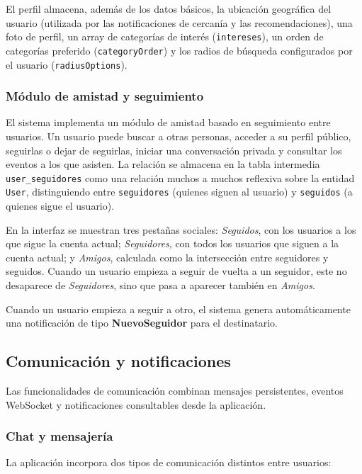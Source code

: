 El perfil almacena, además de los datos básicos, la ubicación geográfica del usuario (utilizada por las notificaciones de cercanía y las recomendaciones), una foto de perfil, un array de categorías de interés (\texttt{intereses}), un orden de categorías preferido (\texttt{categoryOrder}) y los radios de búsqueda configurados por el usuario (\texttt{radiusOptions}).

\subsubsection{Módulo de amistad y seguimiento}

El sistema implementa un módulo de amistad basado en seguimiento entre usuarios. Un usuario puede buscar a otras personas, acceder a su perfil público, seguirlas o dejar de seguirlas, iniciar una conversación privada y consultar los eventos a los que asisten. La relación se almacena en la tabla intermedia \texttt{user\_seguidores} como una relación muchos a muchos reflexiva sobre la entidad \texttt{User}, distinguiendo entre \texttt{seguidores} (quienes siguen al usuario) y \texttt{seguidos} (a quienes sigue el usuario).

En la interfaz se muestran tres pestañas sociales: \textit{Seguidos}, con los usuarios a los que sigue la cuenta actual; \textit{Seguidores}, con todos los usuarios que siguen a la cuenta actual; y \textit{Amigos}, calculada como la intersección entre seguidores y seguidos. Cuando un usuario empieza a seguir de vuelta a un seguidor, este no desaparece de \textit{Seguidores}, sino que pasa a aparecer también en \textit{Amigos}.

Cuando un usuario empieza a seguir a otro, el sistema genera automáticamente una notificación de tipo \textbf{NuevoSeguidor} para el destinatario.

\subsection{Comunicación y notificaciones}

Las funcionalidades de comunicación combinan mensajes persistentes, eventos WebSocket y notificaciones consultables desde la aplicación.

\subsubsection{Chat y mensajería}

La aplicación incorpora dos tipos de comunicación distintos entre usuarios:

